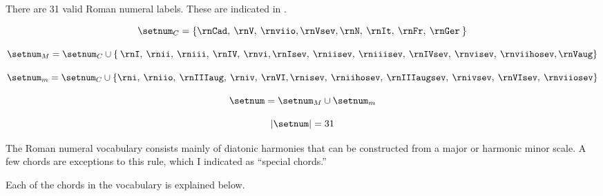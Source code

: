 
There are 31 valid Roman numeral labels. These are indicated
in .



\begin{equation}
    \setnum_{C} = \{ \rnCad, \: \rnV, \: \rnviio,
    \rnVsev, \rnN, \: \rnIt, \: \rnFr, \: \rnGer \: \}
\end{equation}

\begin{equation}
    \setnum_{M} = \setnum_{C} \cup \{ \: \rnI, \: \rnii, \: 
    \rniii, \: \rnIV, \: \rnvi, \rnIsev, \: \rniisev, \: 
    \rniiisev, \: \rnIVsev, \: \rnvisev, \: \rnviihosev, \rnVaug \}
\end{equation}

\begin{equation}
    \setnum_{m} = \setnum_{C} \cup  \{ \rni, \: \rniio, \: 
    \rnIIIaug, \: \rniv, \: \rnVI, \rnisev, \: \rniihosev, \: 
    \rnIIIaugsev, \: \rnivsev, \: \rnVIsev, \: \rnviiosev \}
\end{equation}

\begin{equation}
    \setnum = \setnum_{M} \cup \setnum_{m}
\end{equation}

\begin{equation}
    | \setnum | = 31
\end{equation}

                

The Roman numeral vocabulary consists mainly of diatonic
harmonies that can be constructed from a major or harmonic
minor scale. A few chords are exceptions to this rule, \:
which I indicated as ``special chords.''

Each of the chords in the vocabulary is explained below.


